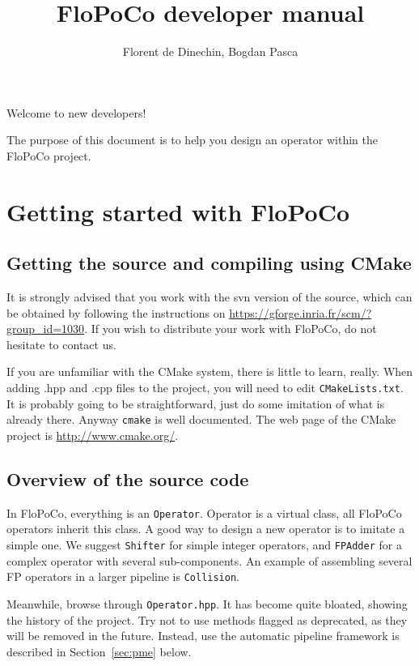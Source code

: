 \documentclass{article}
\title{FloPoCo  developer manual
}
\author{Florent de Dinechin, Bogdan Pasca}
\begin{document}
 
\sloppy



\maketitle


Welcome to new developers! 

The purpose of this document is to help you design an operator within the
FloPoCo project.

 \section{Getting started with FloPoCo}


\subsection{Getting the source and compiling using CMake}

It is strongly advised that you work with the svn version of the
source, which can be obtained by following the instructions on
\url{https://gforge.inria.fr/scm/?group_id=1030}. If you wish to
distribute your work with FloPoCo, do not hesitate to contact us.

If you are unfamiliar with the CMake system, there is little to learn,
really. When adding .hpp and .cpp files to the project, you will need
to edit \texttt{CMakeLists.txt}. It is probably going to be straightforward,
just do some imitation of what is already there. Anyway \texttt{cmake} is well
documented. The web page of the CMake project is \url{http://www.cmake.org/}.


\subsection{Overview of the source code}

In FloPoCo, everything is an \texttt{Operator}. Operator is a virtual
class, all FloPoCo operators inherit this class. A good way to design
a new operator is to imitate a simple one. We suggest
\texttt{Shifter} for simple integer operators, and \texttt{FPAdder}
for a complex operator with several sub-components. An example of
assembling several FP operators in a larger pipeline is
\texttt{Collision}.

 Meanwhile, browse
through \texttt{Operator.hpp}. It has become quite bloated, showing
the history of the project. Try not to use methods flagged as
deprecated, as they will be removed in the future.  Instead, use the
automatic pipeline framework is described in Section~\ref{sec:pme}
below.
\end{document}
